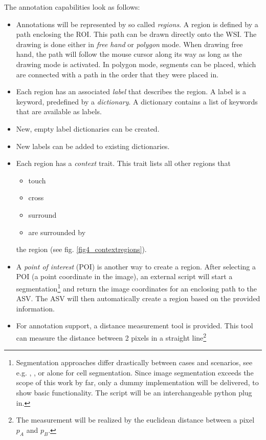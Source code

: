 The annotation capabilities look as follows:
\begin{itemize}
	\item Annotations will be represented by so called \emph{regions}. A region is defined by a path enclosing the ROI. This path can be drawn directly onto the WSI. The drawing is done either in \emph{free hand} or \emph{polygon} mode. When drawing free hand, the path will follow the mouse cursor along its way as long as the drawing mode is activated. In polygon mode, segments can be placed, which are connected with a path in the order that they were placed in.
	
	\item Each region has an associated \emph{label} that describes the region. A label is a keyword, predefined by a \emph{dictionary}. A dictionary contains a list of keywords that are available as labels.
	
	\item New, empty label dictionaries can be created.
	
	\item New labels can be added to existing dictionaries.
	
	\item Each region has a \emph{context} trait. This trait lists all other regions that
	\begin{itemize}
		\item touch
		\item cross
		\item surround
		\item are surrounded by
	\end{itemize}
	the region (see fig. \ref{fig4_contextregions}).

	\item A \emph{point of interest} (POI) is another way to create a region. After selecting a POI (a point coordinate in the image), an external script will start a segmentation\footnote{
		Segmentation approaches differ drastically between cases and scenarios\cite{Liu12}, see e.g. \cite{Qi12}, \cite{Sharma16}, \cite{Wienert12} or \cite{Angulo10} alone for cell segmentation. Since image segmentation exceeds the scope of this work by far, only a dummy implementation will be delivered, to show basic functionality. The script will be an interchangeable python plug in.
	} and return the image coordinates for an enclosing path to the ASV. The ASV will then automatically create a region based on the provided information.
	
	\item For annotation support, a distance measurement tool is provided. This tool can measure the distance between 2 pixels in a straight line\footnote{
		The measurement will be realized by the euclidean distance between a pixel $p_A$ and $p_B$\cite{Strang03}.
	}	
\end{itemize}

